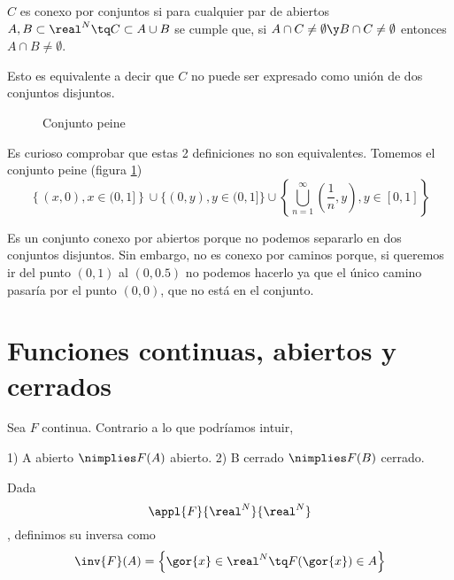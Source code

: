 \documentclass{apuntes}
\begin{document}
\begin{defn}
$C$ es conexo por conjuntos si para cualquier par de abiertos $A,B \subset \real^N \tq C\subset A\cup B$ se cumple que, si $A\cap C\neq \emptyset \y B\cap C \neq \emptyset $ entonces $ A\cap B \neq \emptyset$.

Esto es equivalente a decir que $C$ no puede ser expresado como unión de dos conjuntos disjuntos.
\end{defn}


\begin{remark}

\begin{figure}[hbtp]
\label{imgPeine}
\begin{center}
\caption{Conjunto peine}
\end{center}
\end{figure}

Es curioso comprobar que estas 2 definiciones no son equivalentes. Tomemos el conjunto peine (figura \ref{imgPeine})
\[ \left\{(x,0), x\in (0,1]\right\} \cup \{(0,y), y \in (0,1]\} \cup \left\{\bigcup_{n=1}^{\infty}{\left(\frac{1}{n},y\right), y \in [0,1]}\right\} \]

Es un conjunto conexo por abiertos porque no podemos separarlo en dos conjuntos disjuntos. Sin embargo, no es conexo por caminos porque, si queremos ir del punto $(0,1)$ al $(0,0.5)$ no podemos hacerlo ya que el único camino pasaría por el punto $(0,0)$, que no está en el conjunto.
\end{remark}

\section{Funciones continuas, abiertos y cerrados}
Sea $F$ continua. Contrario a lo que podríamos intuir, 

1) A abierto $\nimplies F(A)$ abierto.
2) B cerrado $\nimplies F(B)$ cerrado.

\begin{defn} Dada \[\appl{F}{\real^N}{\real^N}\], definimos su inversa como
\[ \inv{F}(A) = \left\{\gor{x}\in \real^N \tq F(\gor{x})\in A\right\} \]
\end{defn}
\end{document}
